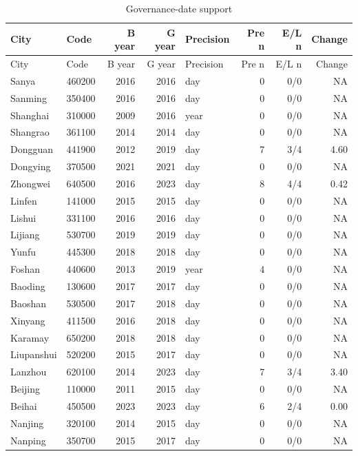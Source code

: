 \begingroup\small\renewcommand{\arraystretch}{1.04}
\begin{longtable}{@{}llrrlrrr@{}}
\caption{Governance-date support}\label{tab:si_governance_support}\\
\toprule
City & Code & B year & G year & Precision & Pre n & E/L n & Change \\\midrule
\endfirsthead
City & Code & B year & G year & Precision & Pre n & E/L n & Change \\\midrule\endhead
Sanya & 460200 & 2016 & 2016 & day & 0 & 0/0 & NA \\
Sanming & 350400 & 2016 & 2016 & day & 0 & 0/0 & NA \\
Shanghai & 310000 & 2009 & 2016 & year & 0 & 0/0 & NA \\
Shangrao & 361100 & 2014 & 2014 & day & 0 & 0/0 & NA \\
Dongguan & 441900 & 2012 & 2019 & day & 7 & 3/4 & 4.60 \\
Dongying & 370500 & 2021 & 2021 & day & 0 & 0/0 & NA \\
Zhongwei & 640500 & 2016 & 2023 & day & 8 & 4/4 & 0.42 \\
Linfen & 141000 & 2015 & 2015 & day & 0 & 0/0 & NA \\
Lishui & 331100 & 2016 & 2016 & day & 0 & 0/0 & NA \\
Lijiang & 530700 & 2019 & 2019 & day & 0 & 0/0 & NA \\
Yunfu & 445300 & 2018 & 2018 & day & 0 & 0/0 & NA \\
Foshan & 440600 & 2013 & 2019 & year & 4 & 0/0 & NA \\
Baoding & 130600 & 2017 & 2017 & day & 0 & 0/0 & NA \\
Baoshan & 530500 & 2017 & 2018 & day & 0 & 0/0 & NA \\
Xinyang & 411500 & 2016 & 2018 & day & 0 & 0/0 & NA \\
Karamay & 650200 & 2018 & 2018 & day & 0 & 0/0 & NA \\
Liupanshui & 520200 & 2015 & 2017 & day & 0 & 0/0 & NA \\
Lanzhou & 620100 & 2014 & 2023 & day & 7 & 3/4 & 3.40 \\
Beijing & 110000 & 2011 & 2015 & day & 0 & 0/0 & NA \\
Beihai & 450500 & 2023 & 2023 & day & 6 & 2/4 & 0.00 \\
Nanjing & 320100 & 2014 & 2015 & day & 0 & 0/0 & NA \\
Nanping & 350700 & 2015 & 2017 & day & 0 & 0/0 & NA \\

\end{longtable}
